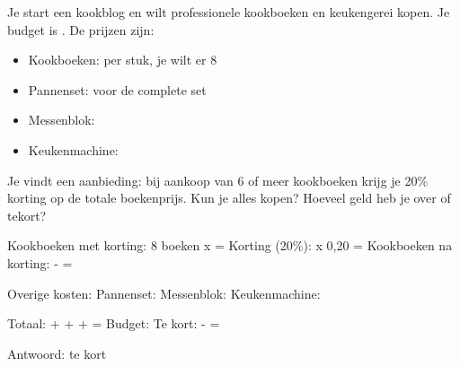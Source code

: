 \begin{opgave}
Je start een kookblog en wilt professionele kookboeken en keukengerei kopen.
Je budget is . De prijzen zijn:

\begin{itemize}
\item Kookboeken:  per stuk, je wilt er 8
\item Pannenset:  voor de complete set
\item Messenblok: 
\item Keukenmachine: 
\end{itemize}

Je vindt een aanbieding: bij aankoop van 6 of meer kookboeken krijg je 20\%
korting op de totale boekenprijs. Kun je alles kopen? Hoeveel geld heb je
over of tekort?
\end{opgave}

\begin{oplossing}
Kookboeken met korting:
8 boeken x  = 
Korting (20\%):  x 0,20 = 
Kookboeken na korting:  -  = 

Overige kosten:
Pannenset: 
Messenblok: 
Keukenmachine: 

Totaal:  +  +  +  = 
Budget: 
Te kort:  -  = 

Antwoord:  te kort
\end{oplossing}